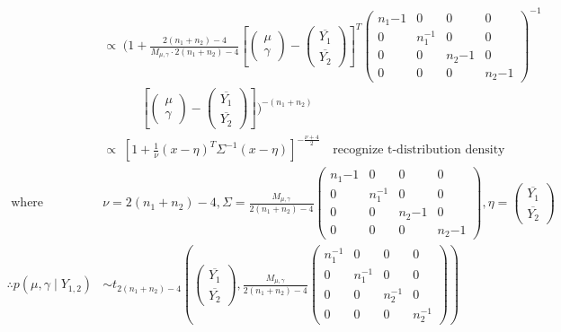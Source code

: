 \documentclass[12pt,letterpaper,twoside]{article}
\begin{document}
\begin{enumerate}[label=(\alph*)]
\begin{align*}
            & \propto \; \biggl(1 + \frac{2(n_1 + n_2) - 4}{M_{\mu, \gamma} \cdot 2(n_1 + n_2) - 4}\left[\left(\begin{matrix}\mu\\ \gamma\end{matrix}\right) - \left(\begin{matrix*}\overline{Y_1}\\ \overline{Y_2}\end{matrix*}\right)\right]^T \left(\begin{matrix*} n_1{-1} & 0 & 0 & 0 \\ 0 & n_1^{-1} & 0 & 0 \\ 0 & 0 & n_2{-1} & 0 \\ 0 & 0 & 0 & n_2{-1} \end{matrix*}\right)^{-1} \\
            & \quad \quad \quad \left[\left(\begin{matrix}\mu\\ \gamma\end{matrix}\right) - \left(\begin{matrix*}\overline{Y_1}\\ \overline{Y_2}\end{matrix*}\right)\right]\biggr)^{-(n_1 + n_2)}\\
            & \propto \; \left[1 + \frac{1}{\nu}(x - \eta)^T\Sigma^{-1}(x - \eta)\right]^{-\frac{\nu + 4}{2}} \quad \text{recognize t-distribution density}\\
        \text{ where }\quad& \nu=2(n_1 + n_2) - 4, \Sigma=\frac{M_{\mu, \gamma}}{2(n_1 + n_2) - 4}\left(\begin{matrix*} n_1{-1} & 0 & 0 & 0 \\ 0 & n_1^{-1} & 0 & 0 \\ 0 & 0 & n_2{-1} & 0 \\ 0 & 0 & 0 & n_2{-1} \end{matrix*}\right), \eta=\left(\begin{matrix*}\overline{Y_1}\\ \overline{Y_2}\end{matrix*}\right)\\
        \therefore p(\mu, \gamma \mid Y_{1,2}) &\sim t_{2(n_1 + n_2) - 4}\left(\left(\begin{matrix*}
            \overline{Y_1}\\ \overline{Y_2} \end{matrix*}\right), \frac{M_{\mu, \gamma}}{2(n_1 + n_2) - 4}\left(\begin{matrix*}
            n_1^{-1} & 0 & 0 & 0 \\ 0 & n_1^{-1} & 0 & 0 \\ 0 & 0 & n_2^{-1} & 0 \\ 0 & 0 & 0 & n_2^{-1}
            \end{matrix*}\right)\right)
    \end{align*}


\end{enumerate}
\end{document}
